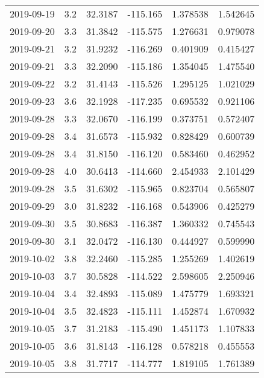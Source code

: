 \begin{tabular}{lrrrrr}
2019-09-19 &       3.2 &  32.3187 &  -115.165 &         1.378538 &         1.542645 \\
2019-09-20 &       3.3 &  31.3842 &  -115.575 &         1.276631 &         0.979078 \\
2019-09-21 &       3.2 &  31.9232 &  -116.269 &         0.401909 &         0.415427 \\
2019-09-21 &       3.3 &  32.2090 &  -115.186 &         1.354045 &         1.475540 \\
2019-09-22 &       3.2 &  31.4143 &  -115.526 &         1.295125 &         1.021029 \\
2019-09-23 &       3.6 &  32.1928 &  -117.235 &         0.695532 &         0.921106 \\
2019-09-28 &       3.3 &  32.0670 &  -116.199 &         0.373751 &         0.572407 \\
2019-09-28 &       3.4 &  31.6573 &  -115.932 &         0.828429 &         0.600739 \\
2019-09-28 &       3.4 &  31.8150 &  -116.120 &         0.583460 &         0.462952 \\
2019-09-28 &       4.0 &  30.6413 &  -114.660 &         2.454933 &         2.101429 \\
2019-09-28 &       3.5 &  31.6302 &  -115.965 &         0.823704 &         0.565807 \\
2019-09-29 &       3.0 &  31.8232 &  -116.168 &         0.543906 &         0.425279 \\
2019-09-30 &       3.5 &  30.8683 &  -116.387 &         1.360332 &         0.745543 \\
2019-09-30 &       3.1 &  32.0472 &  -116.130 &         0.444927 &         0.599990 \\
2019-10-02 &       3.8 &  32.2460 &  -115.285 &         1.255269 &         1.402619 \\
2019-10-03 &       3.7 &  30.5828 &  -114.522 &         2.598605 &         2.250946 \\
2019-10-04 &       3.4 &  32.4893 &  -115.089 &         1.475779 &         1.693321 \\
2019-10-04 &       3.5 &  32.4823 &  -115.111 &         1.452874 &         1.670932 \\
2019-10-05 &       3.7 &  31.2183 &  -115.490 &         1.451173 &         1.107833 \\
2019-10-05 &       3.6 &  31.8143 &  -116.128 &         0.578218 &         0.455553 \\
2019-10-05 &       3.8 &  31.7717 &  -114.777 &         1.819105 &         1.761389 \\

\end{tabular}
